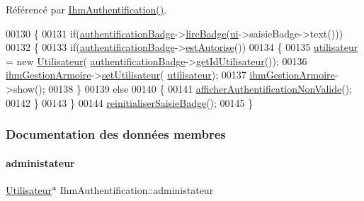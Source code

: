 Référencé par \hyperlink{class_ihm_authentification_a09e60cbdf8d1377e17d940463acb75ba}{Ihm\+Authentification()}.


\begin{DoxyCode}
00130 \{
00131     \textcolor{keywordflow}{if}(\hyperlink{class_ihm_authentification_ac257a02215ec8d5d31e5a1def0c0e86d}{authentificationBadge}->\hyperlink{class_authentification_badge_a77488a375465873bfe6ab62f53abea6d}{lireBadge}(\hyperlink{class_ihm_authentification_a2bab782e7f65474f2817c3916ded9d18}{ui}->saisieBadge->text()))
00132     \{
00133         \textcolor{keywordflow}{if}(\hyperlink{class_ihm_authentification_ac257a02215ec8d5d31e5a1def0c0e86d}{authentificationBadge}->\hyperlink{class_authentification_badge_aceb9c5a09dddbff73cd02973913c79c1}{estAutorise}())
00134         \{
00135             \hyperlink{class_ihm_authentification_ad08cee96c59182c27198907491f0c963}{utilisateur} = \textcolor{keyword}{new} \hyperlink{class_utilisateur}{Utilisateur}(
      \hyperlink{class_ihm_authentification_ac257a02215ec8d5d31e5a1def0c0e86d}{authentificationBadge}->\hyperlink{class_authentification_badge_ae8c755b184c20626d4362d5e4739dfe1}{getIdUtilisateur}());
00136             \hyperlink{class_ihm_authentification_a6ce06a3dbea8b929c3ddffdba011c01f}{ihmGestionArmoire}->\hyperlink{class_ihm_gestion_armoire_af63a0c4424edd90a3c45506dde527b4e}{setUtilisateur}(
      \hyperlink{class_ihm_authentification_ad08cee96c59182c27198907491f0c963}{utilisateur});
00137             \hyperlink{class_ihm_authentification_a6ce06a3dbea8b929c3ddffdba011c01f}{ihmGestionArmoire}->show();
00138         \}
00139         \textcolor{keywordflow}{else}
00140         \{
00141             \hyperlink{class_ihm_authentification_a91a8934658e317870fb6b931608824db}{afficherAuthentificationNonValide}();
00142         \}
00143     \}
00144     \hyperlink{class_ihm_authentification_afa429a3de1da16117b7ce4c9d8f40160}{reinitialiserSaisieBadge}();
00145 \}
\end{DoxyCode}


\subsubsection{Documentation des données membres}
\mbox{\label{class_ihm_authentification_aba994da3a596cab04e35bfbca3e3b1a2}} 
\paragraph{\texorpdfstring{administateur}{administateur}}
{\footnotesize\ttfamily \hyperlink{class_utilisateur}{Utilisateur}$\ast$ Ihm\+Authentification\+::administateur\hspace{0.3cm}{\ttfamily [private]}}

